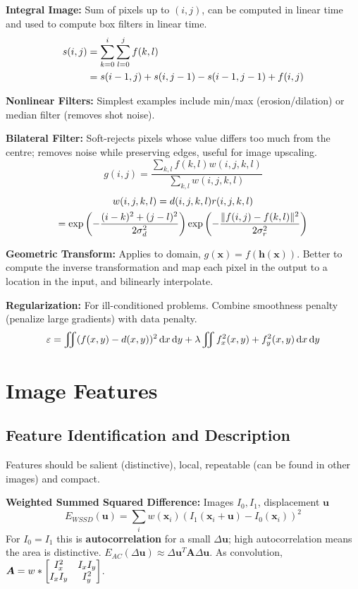 \documentclass[twocolumn, 10pt]{extarticle}
\begin{document}
\textbf{Integral Image:} Sum of pixels up to \((i, j)\), can be computed in linear time and used to compute box filters
in linear time.
\[\alignedeqntwo{s(i, j)}{\sum _{k = 0}^i \sum _{l = 0}^j f(k, l)}{s(i - 1, j) + s(i, j - 1) - s(i - 1, j - 1) + f(i, j)}\]

\textbf{Nonlinear Filters:} Simplest examples include min/max (erosion/dilation) or median filter (removes shot noise).

\textbf{Bilateral Filter:} Soft-rejects pixels whose value differs too much from the centre; removes noise while
preserving edges, useful for image upscaling.
\[g(i, j) = \frac{\sum _{k, l} f(k, l)w(i, j, k, l)}{\sum _{k, l} w(i, j, k, l)}\]
\begin{gather*}
w(i, j, k, l) = d(i, j, k, l)r(i, j, k, l) \\
= \exp\left(-\frac{(i - k)^2 + (j - l)^2}{2\sigma_d^2}\right)\exp\left(-\frac{\lVert f(i, j) - f(k, l)\rVert^2}{2\sigma_r^2}\right)
\end{gather*}

\textbf{Geometric Transform:} Applies to domain, \(g(\bm x) = f(\bm h(\bm x))\). Better to compute the inverse
transformation and map each pixel in the output to a location in the input, and bilinearly interpolate.

\textbf{Regularization:} For ill-conditioned problems. Combine smoothness penalty (penalize large gradients) with data
penalty.
\[
\varepsilon = \iint (f(x, y) - d(x, y))^2\,\mathrm{d}x\,\mathrm{d}y + \lambda \iint f_x^2(x, y) + f_y^2(x, y)\,\mathrm{d}x\,\mathrm{d}y
\]

\section{Image Features} %

\subsection{Feature Identification and Description}

Features should be salient (distinctive), local, repeatable (can be found in other images) and compact.

\textbf{Weighted Summed Squared Difference:} Images \(I_0, I_1\), displacement \(\bm u\)
\[
E_{WSSD}(\bm u) = \sum _i w(\bm x_i)(I_1(\bm x_i + \bm u) - I_0(\bm x_i))^2
\]
For \(I_0 = I_1\) this is \textbf{autocorrelation} for a small \(\Delta\bm u\); high autocorrelation means the area is
distinctive. \(E_{AC}(\Delta\bm u) \approx \Delta\bm u^T\bm A\Delta\bm u\).
As convolution, \(\bm A = w * \begin{bmatrix} {I_x^2} & {I_xI_y} \\ {I_xI_y} & {I_y^2} \end{bmatrix}\).
\end{document}

